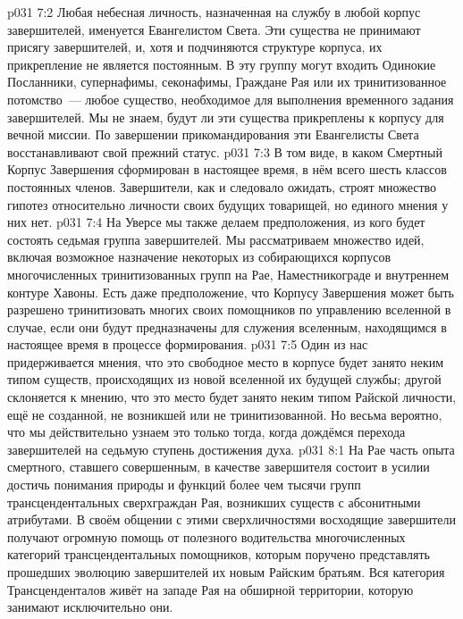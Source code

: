 \vs p031 7:2 Любая небесная личность, назначенная на службу в любой корпус завершителей, именуется Евангелистом Света. Эти существа не принимают присягу завершителей, и, хотя и подчиняются структуре корпуса, их прикрепление не является постоянным. В эту группу могут входить Одинокие Посланники, супернафимы, секонафимы, Граждане Рая или их тринитизованное потомство~--- любое существо, необходимое для выполнения временного задания завершителей. Мы не знаем, будут ли эти существа прикреплены к корпусу для вечной миссии. По завершении прикомандирования эти Евангелисты Света восстанавливают свой прежний статус.
\vs p031 7:3 \pc В том виде, в каком Смертный Корпус Завершения сформирован в настоящее время, в нём всего шесть классов постоянных членов. Завершители, как и следовало ожидать, строят множество гипотез относительно личности своих будущих товарищей, но единого мнения у них нет.
\vs p031 7:4 На Уверсе мы также делаем предположения, из кого будет состоять седьмая группа завершителей. Мы рассматриваем множество идей, включая возможное назначение некоторых из собирающихся корпусов многочисленных тринитизованных групп на Рае, Наместникограде и внутреннем контуре Хавоны. Есть даже предположение, что Корпусу Завершения может быть разрешено тринитизовать многих своих помощников по управлению вселенной в случае, если они будут предназначены для служения вселенным, находящимся в настоящее время в процессе формирования.
\vs p031 7:5 Один из нас придерживается мнения, что это свободное место в корпусе будет занято неким типом существ, происходящих из новой вселенной их будущей службы; другой склоняется к мнению, что это место будет занято неким типом Райской личности, ещё не созданной, не возникшей или не тринитизованной. Но весьма вероятно, что мы действительно узнаем это только тогда, когда дождёмся перехода завершителей на седьмую ступень достижения духа.
\vs p031 8:1 На Рае часть опыта смертного, ставшего совершенным, в качестве завершителя состоит в усилии достичь понимания природы и функций более чем тысячи групп трансцендентальных сверхграждан Рая, возникших существ с абсонитными атрибутами. В своём общении с этими сверхличностями восходящие завершители получают огромную помощь от полезного водительства многочисленных категорий трансцендентальных помощников, которым поручено представлять прошедших эволюцию завершителей их новым Райским братьям. Вся категория Трансценденталов живёт на западе Рая на обширной территории, которую занимают исключительно они.
